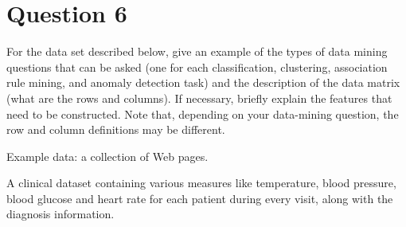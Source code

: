 \documentclass{article}
\begin{document}
\section*{Question 6}{
    For the data set described below, give an example of the types of data mining questions that can be asked (one for each classification, clustering, association rule mining, and anomaly detection task) and the description of the data matrix (what are the rows and columns). If necessary, briefly explain the features that need to be constructed. Note that, depending on your data-mining question, the row and column definitions may be different.

    Example data: a collection of Web pages.

    A clinical dataset containing various measures like temperature, blood pressure, blood glucose and heart rate for each patient during every visit, along with the diagnosis information.

}
\end{document}
